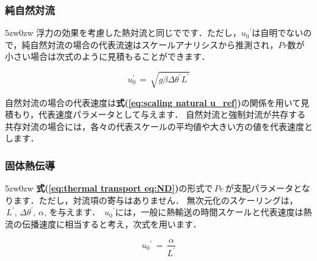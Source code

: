\subsubsection{純自然対流}
\begin{indentation}{5zw}{0zw}
\noindent 浮力の効果を考慮した熱対流と同じでです．ただし，${u_{0}}^{\prime}$は自明でないので，純自然対流の場合の代表流速はスケールアナリシスから推測され\cite{nakayama:02:netsuryuutai}，$Pr$数が小さい場合は次式のように見積もることができます．

\begin{equation}
u_{\mathit 0}^\prime \, = \, \sqrt{g \beta \Delta \theta^\prime L^\prime}
\label{eq:scaling natural u_ref}
\end{equation}

\noindent 自然対流の場合の代表速度は\textbf{式(\ref{eq:scaling natural u_ref})}の関係を用いて見積もり，代表速度パラメータとして与えます．
自然対流と強制対流が共存する共存対流の場合には，各々の代表スケールの平均値や大きい方の値を代表速度とします．\\

\end{indentation}

\subsubsection{固体熱伝導}
\begin{indentation}{5zw}{0zw}
\noindent \textbf{式(\ref{eq:thermal transport eq:ND})}の形式で$\,Pe\,$が支配パラメータとなります．ただし，対流項の寄与はありません．
無次元化のスケーリングは，$\,L^{\prime},\,\Delta \theta^{\prime},\,\alpha,\,$を与えます．
$\,{u_{0}}^{\prime}$には，一般に熱輸送の時間スケールと代表速度は熱流の伝播速度に相当すると考え，次式を用います．

\begin{equation}
{u_{\mathit{0}}}^{\prime} \,= \,\frac{\alpha}{L^{\prime}}
\label{eq:velocity scale in natural convection}
\end{equation}\\
\end{indentation}

\begin{comment}
\subsubsection{共役熱移動}
\begin{indentation}{5zw}{0zw}
\noindent 共役熱移動は，固体中の熱移動と流体中の熱流動を同時に扱うので，必然的に多媒質の熱移動問題となります．熱流動は浮力効果を考慮しています．
\end{indentation}
\end{comment}

